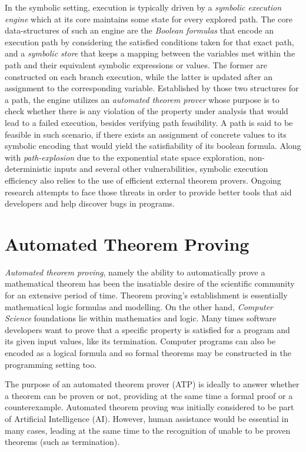 In the symbolic setting, execution is typically driven by a
\textit{symbolic execution engine} which at its core maintains some state
for every explored path. The core data-structures of such
an engine are the \textit{Boolean formulas} that encode an execution path by
considering the satisfied conditions taken for that exact path, and a
\textit{symbolic store} that keeps a mapping between the variables met within the path
and their equivalent symbolic expressions or values. The former are constructed
on each branch execution, while the latter is updated after an assignment to
the corresponding variable. Established by those two structures for a path,
the engine utilizes an \textit{automated theorem prover} whose purpose is to
check whether there is any violation of the property under analysis that
would lead to a failed execution, besides verifying path feasibility. A path
is said to be feasible in such scenario, if there exists an assignment of
concrete values to its symbolic encoding that would yield the satisfiability
of its boolean formula. Along with \textit{path-explosion} due to the exponential state
space exploration, non-deterministic inputs and several other vulnerabilities,
symbolic execution efficiency also relies to the use of efficient external
theorem provers. Ongoing research attempts to face those threats in order
to provide better tools that aid developers and help discover bugs in
programs.

\section{Automated Theorem Proving}

\textit{Automated theorem proving}, namely the ability to automatically prove a
mathematical theorem has been the insatiable desire of the scientific
community for an extensive period of time. Theorem proving's establishment
is essentially mathematical logic formulas and modelling. On the other hand,
\textit{Computer Science} foundations lie within mathematics and logic.
Many times software developers want to prove that a specific property is satisfied
for a program and its given input values, like its termination. Computer
programs can also be encoded as a logical formula and so formal theorems may be
constructed in the programming setting too.

The purpose of an automated theorem prover (ATP) is ideally to answer whether a
theorem can be proven or not, providing at the same time a formal proof
or a counterexample. Automated theorem proving was initially considered to be
part of Artificial Intelligence (AI). However, human assistance would be essential
in many cases, leading at the same time to the recognition of unable to be proven
theorems (such as termination).

